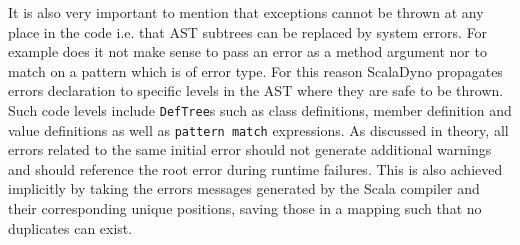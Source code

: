 It is also very important to mention that exceptions cannot be thrown at any place in the code i.e. that AST subtrees can be replaced by system errors. For example does it not make sense to pass an error as a method argument nor to match on a pattern which is of error type. For this reason ScalaDyno propagates errors declaration to specific levels in the AST where they are safe to be thrown. Such code levels include \texttt{DefTree}s such as class definitions, member definition and value definitions as well as \texttt{pattern match} expressions. As discussed in {theory}, all errors related to the same initial error should not generate additional warnings and should reference the root error during runtime failures. This is also achieved implicitly by taking the errors messages generated by the Scala compiler and their corresponding unique positions, saving those in a mapping such that no duplicates can exist.
